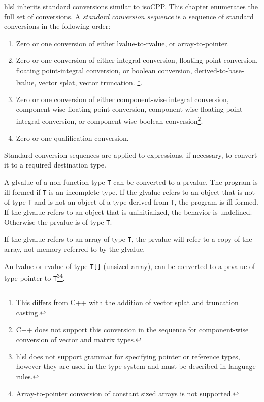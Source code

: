 
\p \acrshort{hlsl} inherits standard conversions similar to \gls{isoCPP}. This
chapter enumerates the full set of conversions. A \textit{standard conversion
sequence} is a sequence of standard conversions in the following
order:
\begin{enumerate}
  \item Zero or one conversion of either lvalue-to-rvalue, or array-to-pointer.
  \item Zero or one conversion of either integral conversion, floating point
  conversion, floating point-integral conversion, or boolean conversion,
  derived-to-base-lvalue, vector splat, vector truncation. \footnote{This
  differs from C++ with the addition of vector splat and truncation casting.}.
  \item Zero or one conversion of either component-wise integral conversion,
  component-wise floating point conversion, component-wise floating
  point-integral conversion, or component-wise boolean
  conversion\footnote{C++ does not support this conversion in the sequence for
  component-wise conversion of vector and matrix types.}.
  \item Zero or one qualification conversion.
\end{enumerate}

Standard conversion sequences are applied to expressions, if necessary, to
convert it to a required destination type.


\p A glvalue of a non-function type \texttt{T} can be converted to a prvalue.
The program is ill-formed if \texttt{T} is an incomplete type. If the glvalue
refers to an object that is not of type \texttt{T} and is not an object of a
type derived from \texttt{T}, the program is ill-formed. If the glvalue refers to
an object that is uninitialized, the behavior is undefined. Otherwise the
prvalue is of type \texttt{T}.

\p If the glvalue refers to an array of type \texttt{T}, the prvalue will refer
to a copy of the array, not memory referred to by the glvalue.


\p An lvalue or rvalue of type \texttt{T[]} (unsized array), can be converted to
a prvalue of type pointer to \texttt{T}\footnote{\acrshort{hlsl} does not
support grammar for specifying pointer or reference types, however they are used
in the type system and must be described in language
rules.}\footnote{Array-to-pointer conversion of constant sized arrays is not
supported.}.

